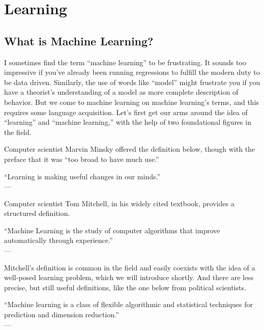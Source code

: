 \section{Learning}

\subsection{What is Machine Learning?}

I sometimes find the term ``machine learning'' to be frustrating. It sounds too impressive if you've already been running regressions to fulfill the modern duty to be data driven. Similarly, the use of words like ``model'' might frustrate you if you have a theorist's understanding of a model as more complete description of behavior. But we come to machine learning on machine learning's terms, and this requires some language acquisition. Let's first get our arms around the idea of ``learning'' and ``machine learning,'' with the help of two foundational figures in the field.

Computer scientist Marvin Minsky offered the definition below, though with the preface that it was ``too broad to have much use.''

\begin{displayquote}
``Learning is making useful changes in our minds.''\\
--- \cite{minsky1986society}
\end{displayquote}

Computer scientist Tom Mitchell, in his widely cited textbook, provides a structured definition.

\begin{displayquote}
``Machine Learning is the study of computer algorithms that improve automatically through experience.''\\
--- \cite{mitchell1997machine}
\end{displayquote}

Mitchell's definition is common in the field and easily coexists with the idea of a well-posed learning problem, which we will introduce shortly. And there are less precise, but still useful definitions, like the one below from political scientists.

\begin{displayquote}
``Machine learning is a class of flexible algorithmic and statistical techniques for prediction and dimension reduction.''\\
--- \cite{grimmer2021machine}
\end{displayquote}

